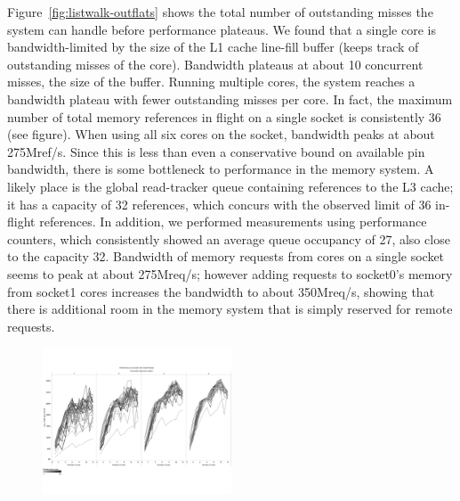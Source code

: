 	 Figure~\ref{fig:listwalk-outflats} shows the total number of outstanding misses the system can handle before performance plateaus. We found that a single core is bandwidth-limited by the size of the L1 cache line-fill buffer (keeps track of outstanding misses of the core). Bandwidth  plateaus at about 10 concurrent misses, the size of the buffer. Running multiple cores, the system reaches a bandwidth plateau with fewer outstanding misses per core. In fact, the maximum number of total memory references in flight on a single socket is consistently 36 (see figure). When using all six cores on the socket, bandwidth peaks at about 275Mref/s. Since this is less than even a conservative bound on available pin bandwidth, there is some bottleneck to performance in the memory system. A likely place is the global read-tracker queue containing references to the L3 cache; it has a capacity of 32 references, which concurs with the observed limit of 36 in-flight references. In addition, we performed measurements using performance counters, which consistently showed an average queue occupancy of 27, also close to the capacity 32.
   
	Bandwidth of memory requests from cores on a single socket seems to peak at about 275Mreq/s; however adding requests to socket0's memory from socket1 cores increases the bandwidth to about	350Mreq/s, showing that there is additional room in the memory system that is simply reserved for remote requests.

\begin{figure}
	\begin{center}
 		\includegraphics[width=0.5\textwidth]{figures/multi-core-green-thread-1gb.pdf}
	\end{center}
	\caption{}
	\label{fig:listwalk-green-threads}
\end{figure}

